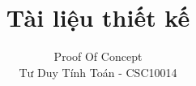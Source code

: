 \documentclass{reportDoCS2025}
\title{Tài liệu thiết kế}
\subtitle{Proof Of Concept \\ Tư Duy Tính Toán - CSC10014}
\begin{document}
\cover
\numRoman

% 



\contents

% 

\pageNumber










% 


% 

\end{document}
